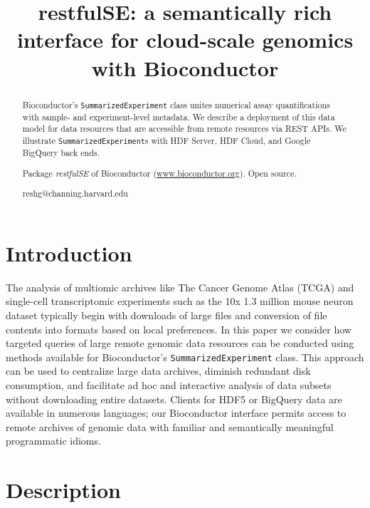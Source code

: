 \documentclass[applications]{gen-bioinformatics}
\author[1]{\pfnm{Shweta}
  \pinit{}
  \psnm{Gopaulakrishnan}}
\author[1]{\pfnm{Samuela}
  \pinit{}
  \psnm{Pollack}}
\author[1]{\pfnm{Benjamin}
  \pinit{}
  \psnm{Stubbs}}
\author[2]{\pfnm{Herv\'e}
  \pinit{}
  \psnm{Pag\`es}}
\author[3]{\pfnm{John}
  \pinit{}
  \psnm{Readey}}
\author[4]{\pfnm{Sean}
  \pinit{}
  \psnm{Davis}}
\author[5]{\pfnm{Levi}
  \pinit{}
  \psnm{Waldron}}
\author[6]{\pfnm{Martin}
  \pinit{T}
  \psnm{Morgan}}
\author[1]{\pfnm{Vincent}
  \pinit{J}
  \psnm{Carey}}
\newcommand{\Rpackage}[1]{{\textit{#1}}}
\begin{document}
\title{restfulSE: a semantically rich interface for cloud-scale genomics
with Bioconductor}
\maketitle

\begin{abstract}
\begin{subabstract}[Summary]
Bioconductor's \verb+SummarizedExperiment+ class unites numerical
assay quantifications with sample- and experiment-level metadata.  We
describe a deployment of this data model for data resources that are
accessible from remote resources via REST APIs.  We illustrate
\verb+SummarizedExperiment+s with HDF Server, HDF Cloud, and Google
BigQuery back ends.
\end{subabstract}
\begin{subabstract}[Availability] Package \Rpackage{restfulSE} of Bioconductor
 (\url {www.bioconductor.org}). Open source.
\end{subabstract}
\begin{subabstract}[Contact]reshg@channing.harvard.edu
\end{subabstract}
\end{abstract}
\section*{Introduction}

The analysis of multiomic archives like The Cancer Genome Atlas (TCGA)
and single-cell transcriptomic experiments such as the 10x 1.3 million
mouse neuron dataset typically begin with downloads of large files and
conversion of file contents into formats based on local preferences.
In this paper we consider how targeted queries of large remote genomic
data resources can be conducted using methods available for
Bioconductor's \verb+SummarizedExperiment+ class.  This approach can
be used to centralize large data archives, diminish redundant disk
consumption, and facilitate ad hoc and interactive analysis of data
subsets without downloading entire datasets. Clients for
HDF5 or BigQuery data are available in numerous languages; our
Bioconductor interface permits access to remote archives of genomic
data with familiar and semantically meaningful programmatic idioms.

\section*{Description}
\end{document}
